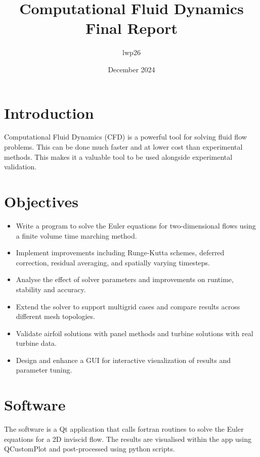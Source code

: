 \documentclass{article}
\begin{document}
\title{Computational Fluid Dynamics \\
    \large Final Report}
\author{lwp26}
\date{December 2024}
\maketitle 

\section{Introduction}

Computational Fluid Dynamics (CFD) is a powerful tool for solving fluid flow problems.
This can be done much faster and at lower cost than experimental methods.
This makes it a valuable tool to be used alongside experimental validation.


\section{Objectives}


\begin{itemize}
    \item Write a program to solve the Euler equations for two-dimensional flows using a finite volume time marching method.
    \item Implement improvements including Runge-Kutta schemes, deferred correction, residual averaging, and spatially varying timesteps.
    \item Analyse the effect of solver parameters and improvements on runtime, stability and accuracy.
    \item Extend the solver to support multigrid cases and compare results across different mesh topologies.
    \item Validate airfoil solutions with panel methods and turbine solutions with real turbine data.
    \item Design and enhance a GUI for interactive visualization of results and parameter tuning.
\end{itemize}

\section{Software}
The software is a Qt application that calls fortran routines to solve the Euler equations for a 2D inviscid flow.
The results are visualised within the app using QCustomPlot and post-processed using python scripts.
\end{document}
